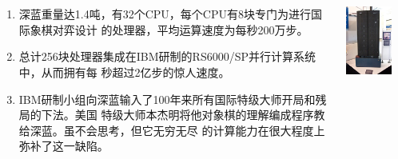\begin{frame}[fragile]
  \frametitle{~}
  \begin{columns}
    \begin{column}[T]{.65\linewidth}
      \begin{enumerate}
      \item 深蓝重量达1.4吨，有32个CPU，每个CPU有8块专门为进行国际象棋对弈设计
        的处理器，平均运算速度为每秒200万步。

        \item 总计256块处理器集成在IBM研制的RS6000/SP并行计算系统中，从而拥有每
          秒超过2亿步的惊人速度。

      \item IBM研制小组向深蓝输入了100年来所有国际特级大师开局和残局的下法。美国
        特级大师本杰明将他对象棋的理解编成程序教给深蓝。虽不会思考，但它无穷无尽
        的计算能力在很大程度上弥补了这一缺陷。
      \end{enumerate}
    \end{column}
    \begin{column}[T]{.3\linewidth}
      \includegraphics[width=0.8\textwidth]{figs/intro/deep_blue_3.png}
    \end{column}
  \end{columns}
\end{frame}

